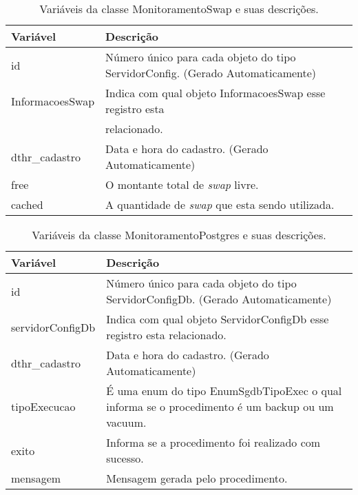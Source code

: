 \begin{table}[!ht]
\centering
\begin{tabular}{|l|l|}
\hline
{\color[HTML]{000000} \textbf{Variável}} & {\color[HTML]{000000} \textbf{Descrição}}                                      \\ \hline
id                                       & \multicolumn{1}{p{10.00cm}|}{Número único para cada objeto do tipo ServidorConfig. (Gerado Automaticamente)}\\ \hline
InformacoesSwap                          & Indica com qual objeto InformacoesSwap esse registro esta  \\
																				 & relacionado.         \\ \hline
dthr\_cadastro                           & Data e hora do cadastro. (Gerado Automaticamente)                              \\ \hline
free                                     & O montante total de \textit{swap} livre.                                                \\ \hline
cached                                   & A quantidade de \textit{swap} que esta sendo utilizada.                                 \\ \hline
\end{tabular}
\caption[Variáveis da classe MonitoramentoSwap e suas descrições.]{Variáveis da classe MonitoramentoSwap e suas descrições.}
\label{Tab:VariaveisMonitoramentoSwap}
\end{table}


\begin{table}[!ht]
\centering
\begin{tabular}{|l|l|}
\hline
{\color[HTML]{000000} \textbf{Variável}} & {\color[HTML]{000000} \textbf{Descrição}}\\ \hline
id                                       &  \multicolumn{1}{p{10.00cm}|}{Número único para cada objeto do tipo ServidorConfigDb. (Gerado Automaticamente)} \\ \hline
servidorConfigDb                         &  \multicolumn{1}{p{10.00cm}|}{Indica com qual objeto ServidorConfigDb esse registro esta relacionado.} \\ \hline
dthr\_cadastro                           &  \multicolumn{1}{p{10.00cm}|}{Data e hora do cadastro. (Gerado Automaticamente)} \\ \hline
tipoExecucao                             &  \multicolumn{1}{p{10.00cm}|}{É uma enum do tipo EnumSgdbTipoExec o qual informa se o procedimento é um backup ou um vacuum. }\\ \hline
exito                                    &  \multicolumn{1}{p{10.00cm}|}{Informa se a procedimento foi realizado com sucesso. }\\ \hline
mensagem                                 &  \multicolumn{1}{p{10.00cm}|}{Mensagem gerada pelo procedimento. }\\ \hline
\end{tabular}
\caption[Variáveis da classe MonitoramentoPostgres e suas descrições.]{Variáveis da classe MonitoramentoPostgres e suas descrições.}
\label{Tab:VariaveisMonitoramentoPostgres}
\end{table}

